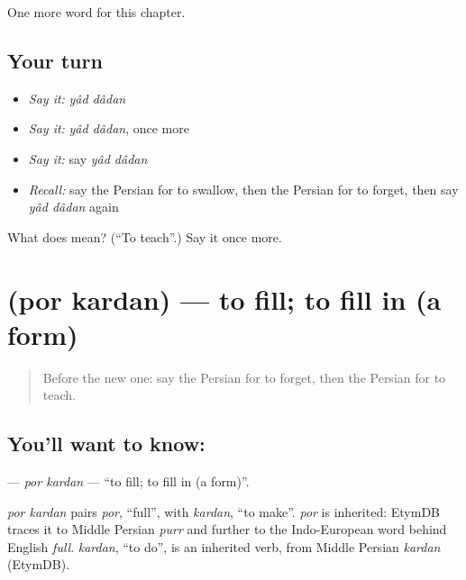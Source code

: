 \begin{grammarlens}[title={What you've built}]
One more word for this chapter.
\end{grammarlens}

\subsection*{Your turn}
\begin{itemize}
\raggedright
  \item \emph{Say it:} \emph{yâd dâdan}
  \item \emph{Say it:} \emph{yâd dâdan}, once more
  \item \emph{Say it:} say \emph{yâd dâdan}
  \item \emph{Recall:} say the Persian for to swallow, then the Persian for to forget, then say \emph{yâd dâdan} again
\end{itemize}

\begin{tcolorbox}[breakable,colback=teal!4,colframe=teal!35!black,title={Before you move on}]
What does   mean? (\textquotedblleft{}To teach\textquotedblright{}.) Say it once more.
\end{tcolorbox}
\section[\texorpdfstring{\fa{پر} \fa{کردن} (por kardan)}{پر کردن (por kardan)}]{  (por kardan) — to fill; to fill in (a form)}

\label{lesson:FA-C143-por-kardan}



\begin{quote}
Before the new one: say the Persian for to forget, then the Persian for to teach.
\end{quote}

\subsection*{You'll want to know:  }
\textbf{ } — \emph{por kardan} — \textquotedblleft{}to fill; to fill in (a form)\textquotedblright{}.

\begin{cousinweb}
\emph{por kardan} pairs \emph{por}, \textquotedblleft{}full\textquotedblright{}, with \emph{kardan}, \textquotedblleft{}to make\textquotedblright{}. \emph{por} is inherited: EtymDB traces it to Middle Persian \emph{purr} and further to the Indo-European word behind English \emph{full}. \emph{kardan}, \textquotedblleft{}to do\textquotedblright{}, is an inherited verb, from Middle Persian \emph{kardan} (EtymDB).
\end{cousinweb}

